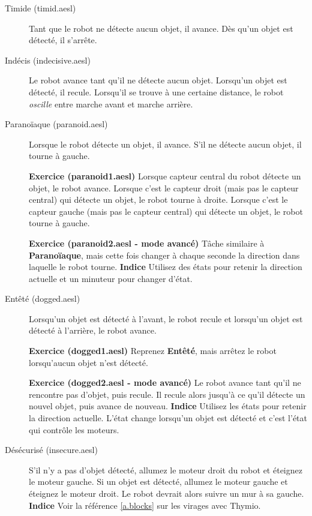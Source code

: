 
\begin{description}

\item[Timide (timid.aesl)] Tant que le robot ne détecte aucun objet, il avance. 
Dès qu'un objet est détecté, il s'arrête.

\item[Indécis (indecisive.aesl)] Le robot avance tant qu'il ne détecte aucun objet.
Lorsqu'un objet est détecté, il recule.
Lorsqu'il se trouve à une certaine distance, le robot \emph{oscille}
entre marche avant et marche arrière.

\item[Paranoïaque (paranoid.aesl)] Lorsque le robot détecte un objet, il avance. S'il ne détecte
aucun objet, il tourne à gauche.

\textbf{Exercice (paranoid1.aesl)} 
Lorsque capteur central du robot détecte un objet, le robot avance.
Lorsque c'est le capteur droit (mais pas le capteur central) qui détecte un objet,
le robot tourne à droite.
Lorsque c'est le capteur gauche (mais pas le capteur central) qui détecte un objet,
le robot tourne à gauche.

\textbf{Exercice (paranoid2.aesl - mode avancé)} 
Tâche similaire à \textbf{Paranoïaque}, mais cette fois changer à chaque seconde la direction dans laquelle le robot tourne. \textbf{Indice} Utilisez des états pour retenir la direction actuelle
et un minuteur pour changer d'état.

\item[Entêté (dogged.aesl)] Lorsqu'un objet est détecté à l'avant, le robot recule et
lorsqu'un objet est détecté à l'arrière, le robot avance.

\textbf{Exercice (dogged1.aesl)}
Reprenez \textbf{Entêté}, mais arrêtez le robot lorsqu'aucun objet n'est détecté.

\textbf{Exercice (dogged2.aesl - mode avancé)}
Le robot avance tant qu'il ne rencontre pas d'objet, puis recule.
Il recule alors jusqu'à ce qu'il détecte un nouvel objet, puis avance de nouveau.
\textbf{Indice} Utilisez les états pour retenir la direction actuelle.
L'état change lorsqu'un objet est détecté et c'est l'état qui contrôle les moteurs.

\item[Désécurisé (insecure.aesl)]
S'il n'y a pas d'objet détecté, allumez le moteur droit du robot et éteignez le moteur gauche.
Si un objet est détecté, allumez le moteur gauche et éteignez le moteur droit.
Le robot devrait alors suivre un mur à sa gauche.
\textbf{Indice} Voir la référence \cref{a.blocks} sur les virages avec Thymio.


\end{description}
